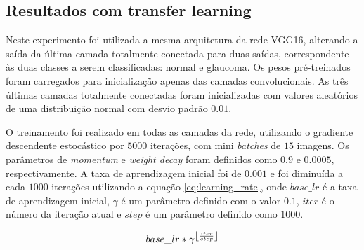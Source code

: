 \documentclass[conference]{IEEEtran}
\DeclarePairedDelimiter\floor{\lfloor}{\rfloor}
\begin{document}


  \subsection{Resultados com transfer learning}


  Neste experimento foi utilizada a mesma arquitetura da rede VGG16, alterando a saída da última camada totalmente conectada para duas saídas, correspondente às duas classes a serem classificadas: normal e glaucoma. Os pesos pré-treinados foram carregados para inicialização apenas das camadas convolucionais. As três últimas camadas totalmente conectadas foram inicializadas com valores aleatórios de uma distribuição normal com desvio padrão $0.01$. %
  
  O treinamento foi realizado em todas as camadas da rede, utilizando o gradiente descendente estocástico por $5000$ iterações, com mini \textit{batches} de $15$ imagens. Os parâmetros de \textit{momentum} e \textit{weight decay} foram definidos como $0.9$ e $0.0005$, respectivamente. A taxa de aprendizagem inicial foi de $0.001$ e foi diminuída a cada $1000$ iterações utilizando a equação \ref{eq:learning_rate}, onde $base\_lr$ é a taxa de aprendizagem inicial, $\gamma$ é um parâmetro definido com o valor $0.1$, $iter$ é o número da iteração atual e $step$ é um parâmetro definido como $1000$.

  \begin{equation}
    base\_lr * \gamma^{\floor*{\frac{iter}{step}}}
    \label{eq:learning_rate}
  \end{equation}
\end{document}
